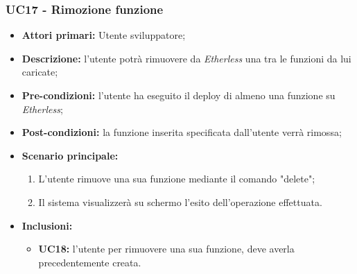 \subsubsection{UC17 - Rimozione funzione}
\begin{itemize}
	\item \textbf{Attori primari:} Utente sviluppatore;
	\item \textbf{Descrizione:} l'utente potrà rimuovere da \textit{Etherless} una tra le funzioni da lui caricate; 
	\item \textbf{Pre-condizioni:} l'utente ha eseguito il deploy di almeno una funzione su \textit{Etherless};
	\item \textbf{Post-condizioni:} la funzione inserita specificata dall'utente verrà rimossa;
	\item \textbf{Scenario principale:} 
	\begin{enumerate}
		\item L'utente rimuove una sua funzione mediante il comando "delete";
		\item Il sistema visualizzerà su schermo l'esito dell'operazione effettuata.
	\end{enumerate}
	\item \textbf{Inclusioni:} 
	\begin{itemize}
		\item \textbf{UC18:} l'utente per rimuovere una sua funzione, deve averla precedentemente creata.
	\end{itemize}
\end{itemize}